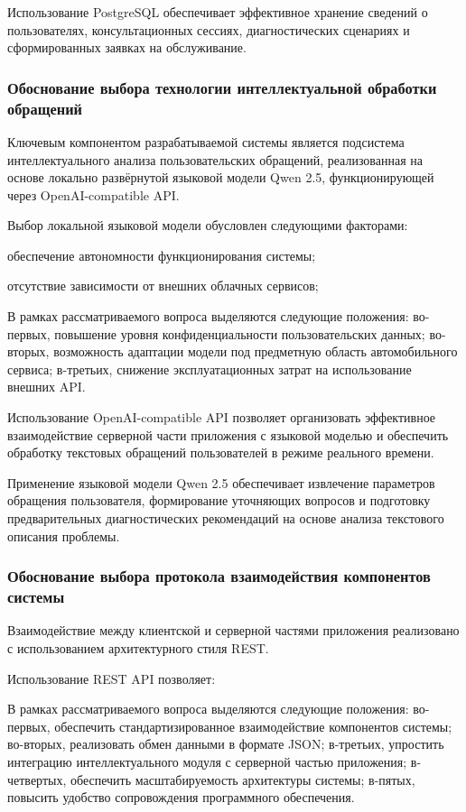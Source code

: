 \documentclass[14pt,a4paper]{extarticle}
\numberwithin{figure}{section}
\numberwithin{table}{section}
\begin{document}
Использование PostgreSQL обеспечивает эффективное хранение сведений о
пользователях, консультационных сессиях, диагностических сценариях и
сформированных заявках на обслуживание.

\subsubsection{Обоснование выбора технологии интеллектуальной обработки
обращений}

Ключевым компонентом разрабатываемой системы является подсистема
интеллектуального анализа пользовательских обращений, реализованная на
основе локально развёрнутой языковой модели Qwen 2.5, функционирующей
через OpenAI-compatible API.

Выбор локальной языковой модели обусловлен следующими факторами:

обеспечение автономности функционирования системы;

отсутствие зависимости от внешних облачных сервисов;


В рамках рассматриваемого вопроса выделяются следующие положения: во-первых, повышение уровня конфиденциальности пользовательских данных; во-вторых, возможность адаптации модели под предметную область автомобильного сервиса; в-третьих, снижение эксплуатационных затрат на использование внешних API.


Использование OpenAI-compatible API позволяет организовать эффективное
взаимодействие серверной части приложения с языковой моделью и
обеспечить обработку текстовых обращений пользователей в режиме
реального времени.

Применение языковой модели Qwen 2.5 обеспечивает извлечение параметров
обращения пользователя, формирование уточняющих вопросов и подготовку
предварительных диагностических рекомендаций на основе анализа
текстового описания проблемы.

\subsubsection{Обоснование выбора протокола взаимодействия компонентов
системы}

Взаимодействие между клиентской и серверной частями приложения
реализовано с использованием архитектурного стиля REST.

Использование REST API позволяет:


В рамках рассматриваемого вопроса выделяются следующие положения: во-первых, обеспечить стандартизированное взаимодействие компонентов системы; во-вторых, реализовать обмен данными в формате JSON; в-третьих, упростить интеграцию интеллектуального модуля с серверной частью приложения; в-четвертых, обеспечить масштабируемость архитектуры системы; в-пятых, повысить удобство сопровождения программного обеспечения.
\end{document}
